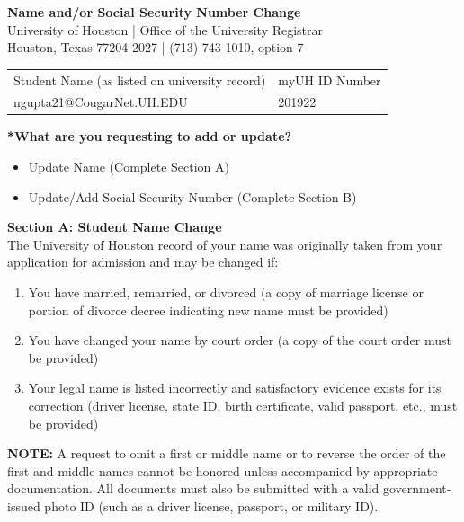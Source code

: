 \documentclass[12pt]{article}
\newcommand{\CheckedBox}[1]{%
  \ifthenelse{\equal{#1}{yes}}{$\boxtimes$}{$\square$}%
}
\begin{document}
\begin{center}
\textbf{Name and/or Social Security Number Change}\\
University of Houston | Office of the University Registrar\\
Houston, Texas 77204-2027 | (713) 743-1010, option 7
\end{center}

\vspace{1em}
\noindent\begin{tabular}{@{}p{}p{}@{}}
Student Name (as listed on university record) & myUH ID Number\\
ngupta21@CougarNet.UH.EDU & 201922\\
\end{tabular}

\vspace{1em}
\noindent\textbf{*What are you requesting to add or update?}\\
\begin{itemize}[leftmargin=0.7cm]
	\item \CheckedBox{no} Update Name (Complete Section A)
	\item \CheckedBox{yes} Update/Add Social Security Number (Complete Section B)
\end{itemize}

\vspace{1em}
\noindent\textbf{Section A: Student Name Change}\\
The University of Houston record of your name was originally taken from your application for admission and may be changed if:
\begin{enumerate}
\item You have married, remarried, or divorced (a copy of marriage license or portion of divorce decree indicating new name must be provided)
\item You have changed your name by court order (a copy of the court order must be provided)
\item Your legal name is listed incorrectly and satisfactory evidence exists for its correction (driver license, state ID, birth certificate, valid passport, etc., must be provided)
\end{enumerate}

\noindent\textbf{NOTE:} A request to omit a first or middle name or to reverse the order of the first and middle names cannot be honored unless accompanied by appropriate documentation. All documents must also be submitted with a valid government-issued photo ID (such as a driver license, passport, or military ID).
\end{document}
